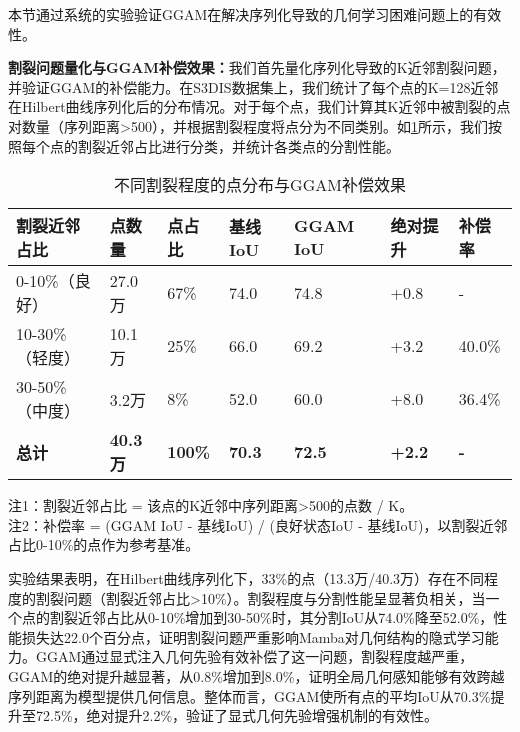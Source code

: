 \documentclass[preprint,12pt]{elsarticle}
\begin{document}
本节通过系统的实验验证GGAM在解决序列化导致的几何学习困难问题上的有效性。


\textbf{割裂问题量化与GGAM补偿效果：}我们首先量化序列化导致的K近邻割裂问题，并验证GGAM的补偿能力。在S3DIS数据集上，我们统计了每个点的K=128近邻在Hilbert曲线序列化后的分布情况。对于每个点，我们计算其K近邻中被割裂的点对数量（序列距离>500），并根据割裂程度将点分为不同类别。如\cref{tab:split_and_repair}所示，我们按照每个点的割裂近邻占比进行分类，并统计各类点的分割性能。

\begin{table}[htbp!]
	\centering
	\caption{不同割裂程度的点分布与GGAM补偿效果}
	\label{tab:split_and_repair}
	\begin{tabular}{@{}lllllll@{}}
		\toprule
		割裂近邻占比 & 点数量 & 点占比 & 基线IoU & GGAM IoU & 绝对提升 & 补偿率 \\
		\midrule
		0-10\%（良好） & 27.0万 & 67\% & 74.0 & 74.8 & +0.8 & - \\
		\midrule
		10-30\%（轻度） & 10.1万 & 25\% & 66.0 & 69.2 & +3.2 & 40.0\% \\
		30-50\%（中度） & 3.2万 & 8\% & 52.0 & 60.0 & +8.0 & 36.4\% \\
		\midrule
		\textbf{总计} & \textbf{40.3万} & \textbf{100\%} & \textbf{70.3} & \textbf{72.5} & \textbf{+2.2} & \textbf{-} \\
		\bottomrule
	\end{tabular}
\end{table}

注1：割裂近邻占比 = 该点的K近邻中序列距离>500的点数 / K。\\
注2：补偿率 = (GGAM IoU - 基线IoU) / (良好状态IoU - 基线IoU)，以割裂近邻占比0-10\%的点作为参考基准。

实验结果表明，在Hilbert曲线序列化下，33\%的点（13.3万/40.3万）存在不同程度的割裂问题（割裂近邻占比>10\%）。割裂程度与分割性能呈显著负相关，当一个点的割裂近邻占比从0-10\%增加到30-50\%时，其分割IoU从74.0\%降至52.0\%，性能损失达22.0个百分点，证明割裂问题严重影响Mamba对几何结构的隐式学习能力。GGAM通过显式注入几何先验有效补偿了这一问题，割裂程度越严重，GGAM的绝对提升越显著，从0.8\%增加到8.0\%，证明全局几何感知能够有效跨越序列距离为模型提供几何信息。整体而言，GGAM使所有点的平均IoU从70.3\%提升至72.5\%，绝对提升2.2\%，验证了显式几何先验增强机制的有效性。


\end{document}
